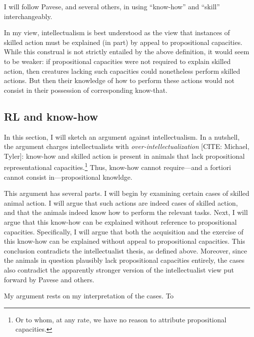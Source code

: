 I will follow Pavese, and several others, in using ``know-how'' and ``skill'' interchangeably.

In my view, intellectualism is best understood as the view that instances of skilled action must be explained (in part) by appeal to propositional capacities.
While this construal is not strictly entailed by the above definition, it would seem to be weaker: if propositional capacities were not required to explain skilled action, then creatures lacking such capacities could nonetheless perform skilled actions.
But then their knowledge of how to perform these actions would not consist in their possession of corresponding know-that.


\subsection{RL and know-how}

In this section, I will sketch an argument against intellectualism.
In a nutshell, the argument charges intellectualists with \emph{over-intellectualization} [CITE: Michael, Tyler]: know-how and skilled action is present in animals that lack propositional representational capacities.\footnote{Or to whom, at any rate, we have no reason to attribute propositional capacities.}
Thus, know-how cannot require---and a fortiori cannot consist in---propositional knowldge.

This argument has several parts.
I will begin by examining certain cases of skilled animal action.
I will argue that such actions are indeed cases of skilled action, and that the animals indeed know how to perform the relevant tasks.
Next, I will argue that this know-how can be explained without reference to propositional capacities.
Specifically, I will argue that both the acquisition and the exercise of this know-how can be explained without appeal to propositional capacities.
This conclusion contradicts the intellectualist thesis, as defined above.
Moreover, since the animals in question plausibly lack propositional capacities entirely, the cases also contradict the apparently stronger version of the intellectualist view put forward by Pavese and others.


My argument rests on my interpretation of the cases.
To 
